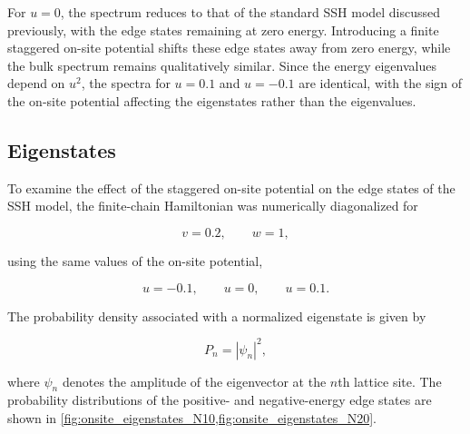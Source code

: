 \documentclass[11pt, a4paper]{article}
\begin{document}
For $u=0$, the spectrum reduces to that of the standard SSH model discussed
previously, with the edge states remaining at zero energy. Introducing a
finite staggered on-site potential shifts these edge states away from zero
energy, while the bulk spectrum remains qualitatively similar. Since the
energy eigenvalues depend on $u^2$, the spectra for $u=0.1$ and $u=-0.1$
are identical, with the sign of the on-site potential affecting the
eigenstates rather than the eigenvalues.

\subsection{Eigenstates}

To examine the effect of the staggered on-site potential on the edge
states of the SSH model, the finite-chain Hamiltonian was numerically
diagonalized for

\[
v=0.2,\qquad
w=1,
\]

using the same values of the on-site potential,

\[
u=-0.1,\qquad
u=0,\qquad
u=0.1.
\]

The probability density associated with a normalized eigenstate is given by

\[
P_n=|\psi_n|^2,
\]

where $\psi_n$ denotes the amplitude of the eigenvector at the $n$th lattice
site. The probability distributions of the positive- and negative-energy
edge states are shown in \cref{fig:onsite_eigenstates_N10,fig:onsite_eigenstates_N20}.
\end{document}
